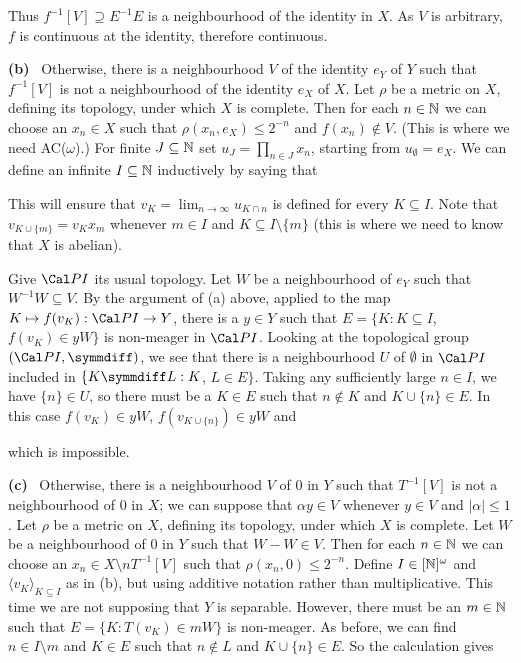 {

\noindent Thus $f^{-1}[V]\supseteq E^{-1}E$ is a neighbourhood of the
identity in $X$.   As $V$ is arbitrary, $f$ is continuous at the identity,
therefore continuous.

\medskip

{\bf (b)} \Quer\ Otherwise, there is a neighbourhood $V$ of the identity
$e_Y$ of $Y$ such that $f^{-1}[V]$ is not a neighbourhood of the identity
$e_X$ of $X$.   Let $\rho$ be a metric on $X$, defining its topology, under
which $X$ is complete.   Then for each $n\in\Bbb N$ we can choose an
$x_n\in X$ such that $\rho(x_n,e_X)\le 2^{-n}$ and $f(x_n)\notin V$.
(This is where we need AC($\omega$).)   For finite $J\subseteq\Bbb N$
set $u_J=\prod_{n\in J}x_n$, starting from $u_{\emptyset}=e_X$.
We can define an infinite $I\subseteq\Bbb N$ inductively by saying that


\noindent This will ensure
that $v_K=\lim_{n\to\infty}u_{K\cap n}$ is defined for every
$K\subseteq I$.   Note that $v_{K\cup\{m\}}=v_Kx_m$ whenever $m\in I$ and
$K\subseteq I\setminus\{m\}$
(this is where we need to know that $X$ is abelian).

Give $\Cal PI$ its usual topology.
Let $W$ be a neighbourhood of $e_Y$ such that $W^{-1}W\subseteq V$.
By the argument of (a) above, applied to the map
$K\mapsto f(v_K):\Cal PI\to Y$,
there is a $y\in Y$ such that $E=\{K:K\subseteq I$, $f(v_K)\in yW\}$
is non-meager in $\Cal PI$.   Looking at the topological group
$(\Cal PI,\symmdiff)$, we see that there is a neighbourhood $U$ of
$\emptyset$ in $\Cal PI$ included in $\{K\symmdiff L:K$, $L\in E\}$.
Taking any sufficiently large $n\in I$, we have $\{n\}\in U$, so there must
be a $K\in E$ such that $n\notin K$ and $K\cup\{n\}\in E$.
In this case $f(v_K)\in yW$, $f(v_{K\cup\{n\}})\in yW$ and


\noindent which is impossible.\ \Bang

\medskip

{\bf (c)} \Quer\ Otherwise, there is a neighbourhood $V$ of $0$ in $Y$ such
that $T^{-1}[V]$ is not a neighbourhood of $0$ in $X$;  we can suppose that
$\alpha y\in V$ whenever $y\in V$ and $|\alpha|\le 1$.
Let $\rho$ be a metric on $X$, defining its topology, under
which $X$ is complete.   Let $W$ be a neighbourhood of $0$ in $Y$ such that
$W-W\in V$.   Then for each $n\in\Bbb N$ we can choose an
$x_n\in X\setminus nT^{-1}[V]$ such that
$\rho(x_n,0)\le 2^{-n}$.   Define $I\in[\Bbb N]^{\omega}$ and
$\langle v_K\rangle_{K\subseteq I}$ as in (b), but using additive notation
rather than multiplicative.   This time we are not
supposing that $Y$ is separable.   However, there must be an $m\in\Bbb N$
such that $E=\{K:T(v_K)\in mW\}$ is non-meager.   As before, we can find
$n\in I\setminus m$ and $K\in E$ such that
$n\notin L$ and $K\cup\{n\}\in E$.   So the calculation gives

}
